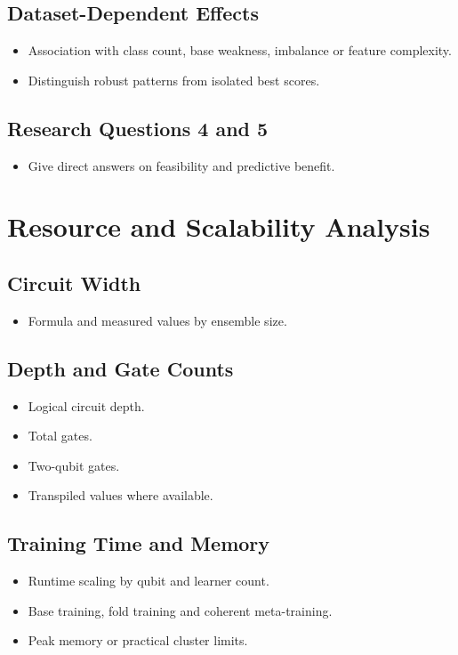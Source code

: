 \documentclass[]{UCD_CS_MSc_AAI_Report}
\begin{document}
\subsection{Dataset-Dependent Effects}
\begin{itemize}
    \item Association with class count, base weakness, imbalance or feature complexity.
    \item Distinguish robust patterns from isolated best scores.
\end{itemize}

\subsection{Research Questions 4 and 5}
\begin{itemize}
    \item Give direct answers on feasibility and predictive benefit.
\end{itemize}

\section{Resource and Scalability Analysis}
\label{sec:results-resources}

\subsection{Circuit Width}
\begin{itemize}
    \item Formula and measured values by ensemble size.
\end{itemize}

\subsection{Depth and Gate Counts}
\begin{itemize}
    \item Logical circuit depth.
    \item Total gates.
    \item Two-qubit gates.
    \item Transpiled values where available.
\end{itemize}

\subsection{Training Time and Memory}
\begin{itemize}
    \item Runtime scaling by qubit and learner count.
    \item Base training, fold training and coherent meta-training.
    \item Peak memory or practical cluster limits.
\end{itemize}
\end{document}
